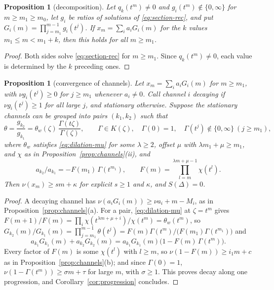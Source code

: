 \documentclass[11pt,a4paper]{article}
\newcommand{\val}{\nu}
\theoremstyle{plain}
\newtheorem{proposition}[theorem]{Proposition}
\theoremstyle{definition}
\theoremstyle{remark}
\begin{document}
\begin{proposition}[decomposition]\label{prop:decomp}
Let $q_k(t^m)\ne0$ and $g_i(t^m)\notin\{0,\infty\}$ for $m\ge m_1\ge m_0$, let
$g_i$ be ratios of solutions of \eqref{eq:section-rec}, and put
$G_i(m)=\prod_{j=m_1}^{m-1}g_i(t^j)$. If $x_m=\sum_ia_iG_i(m)$ for the $k$
values $m_1\le m<m_1+k$, then this holds for all $m\ge m_1$.
\end{proposition}
\begin{proof}
Both sides solve \eqref{eq:section-rec} for $m\ge m_1$. Since
$q_k(t^m)\ne0$, each value is determined by the $k$ preceding ones.
\end{proof}

\begin{proposition}[convergence of channels]\label{prop:channels2}
Let $x_m=\sum_ia_iG_i(m)$ for $m\ge m_1$, with $\val g_i(t^j)\ge0$ for $j\ge m_1$
whenever $a_i\ne0$. Call channel $i$ \emph{decaying} if $\val g_i(t^j)\ge1$ for
all large $j$, and \emph{stationary} otherwise. Suppose the stationary channels
can be grouped into pairs $(k_1,k_2)$ such that
\[
  \theta=\frac{g_{k_2}}{g_{k_1}}=\theta_w(\zeta)\,\frac{\Gamma(t\zeta)}{\Gamma(\zeta)},
  \qquad \Gamma\in K(\zeta),\quad \Gamma(0)=1,\quad
  \Gamma(t^j)\notin\{0,\infty\}\ (j\ge m_1),
\]
where $\theta_w$ satisfies \eqref{eq:dilation-mu} for some $\lambda\ge2$, offset
$\mu$ with $\lambda m_1+\mu\ge m_1$, and $\chi$ as in
Proposition~\ref{prop:channels}(ii), and
\[
  a_{k_2}/a_{k_1}=-F(m_1)\,\Gamma(t^{m_1}),\qquad F(m)=\prod_{l=m}^{\lambda m+\mu-1}\chi(t^l).
\]
Then $\val(x_m)\ge sm+\kappa$ for explicit $s\ge1$ and $\kappa$, and
$S(\Delta)=0$.
\end{proposition}
\begin{proof}
A decaying channel has $\val(a_iG_i(m))\ge\val a_i+m-M_i$, as in
Proposition~\ref{prop:channels}(a). For a pair, \eqref{eq:dilation-mu} at
$\zeta=t^m$ gives $F(m+1)/F(m)=\prod_i\chi(t^{\lambda m+\mu+i})/\chi(t^m)=\theta_w(t^m)$,
so $G_{k_2}(m)/G_{k_1}(m)=\prod_{j=m_1}^{m-1}\theta(t^j)
=F(m)\Gamma(t^m)/\bigl(F(m_1)\Gamma(t^{m_1})\bigr)$ and
\[
  a_{k_1}G_{k_1}(m)+a_{k_2}G_{k_2}(m)=a_{k_1}G_{k_1}(m)\bigl(1-F(m)\,\Gamma(t^m)\bigr).
\]
Every factor of $F(m)$ is some $\chi(t^l)$ with $l\ge m$, so
$\val(1-F(m))\ge i_1m+c$ as in Proposition~\ref{prop:channels}(b); and since
$\Gamma(0)=1$, $\val(1-\Gamma(t^m))\ge\sigma m+\tau$ for large $m$, with
$\sigma\ge1$. This proves decay along one progression, and
Corollary~\ref{cor:progression} concludes.
\end{proof}
\end{document}
